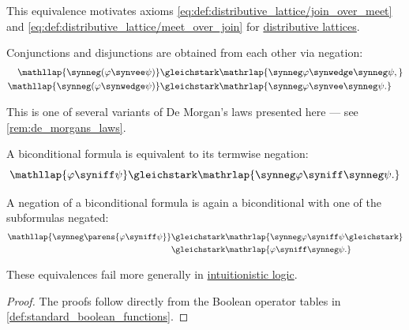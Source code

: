 \begin{proposition}
\begin{thmenum}
    This equivalence motivates axioms \eqref{eq:def:distributive_lattice/join_over_meet} and \eqref{eq:def:distributive_lattice/meet_over_join} for \hyperref[def:distributive_lattice]{distributive lattices}.

     Conjunctions and disjunctions are obtained from each other via negation:
    \begin{align}
      \mathllap{\synneg (\varphi \synvee \psi)}   &\gleichstark \mathrlap{\synneg \varphi \synwedge \synneg \psi,} \label{eq:thm:classical_equivalences/de_morgan/complement_of_join} \\
      \mathllap{\synneg (\varphi \synwedge \psi)} &\gleichstark \mathrlap{\synneg \varphi \synvee \synneg \psi.}   \label{eq:thm:classical_equivalences/de_morgan/complement_of_meet}
    \end{align}

    This is one of several variants of De Morgan's laws presented here --- see \cref{rem:de_morgans_laws}.

     A biconditional formula is equivalent to its termwise negation:
    \begin{equation}\label{eq:thm:classical_equivalences/biconditional_member_negation}
      \mathllap{\varphi \syniff \psi} \gleichstark \mathrlap{\synneg \varphi \syniff \synneg \psi.}
    \end{equation}

     A negation of a biconditional formula is again a biconditional with one of the subformulas negated:
    \begin{equation}\label{eq:thm:classical_equivalences/biconditional_negation}
      \begin{aligned}
        \mathllap{\synneg \parens{\varphi \syniff \psi}}
        &\gleichstark
        \mathrlap{\synneg \varphi \syniff \psi \gleichstark}
        \\ &\gleichstark
        \mathrlap{\varphi \syniff \synneg \psi.}
      \end{aligned}
    \end{equation}
  \end{thmenum}
\end{proposition}
\begin{comments}
  \item These equivalences fail more generally in \hyperref[con:intuitionistic_logic]{intuitionistic logic}.
\end{comments}
\begin{proof}
  The proofs follow directly from the Boolean operator tables in \cref{def:standard_boolean_functions}.
\end{proof}

